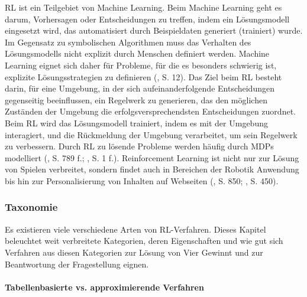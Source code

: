 \label{reinforcement-learning}

RL ist ein Teilgebiet von Machine Learning. Beim Machine Learning geht es darum, Vorhersagen oder Entscheidungen zu treffen, indem ein Lösungsmodell eingesetzt wird, das automatisiert durch Beispieldaten generiert (trainiert) wurde. Im Gegensatz zu symbolischen Algorithmen muss das Verhalten des Lösungsmodells nicht explizit durch Menschen definiert werden. Machine Learning eignet sich daher für Probleme, für die es besonders schwierig ist, explizite Lösungsstrategien zu definieren (\cite{Humm.2020}, S. 12). Das Ziel beim RL besteht darin, für eine Umgebung, in der sich aufeinanderfolgende Entscheidungen gegenseitig beeinflussen, ein Regelwerk zu generieren, das den möglichen Zuständen der Umgebung die erfolgsversprechendsten Entscheidungen zuordnet. Beim RL wird das Lösungsmodell trainiert, indem es mit der Umgebung interagiert, und die Rückmeldung der Umgebung verarbeitet, um sein Regelwerk zu verbessern. Durch RL zu lösende Probleme werden häufig durch MDPs modelliert (\cite{Russell.2020}, S. 789 f.; \cite{Sutton.2018}, S. 1 f.). Reinforcement Learning ist nicht nur zur Lösung von Spielen verbreitet, sondern findet auch in Bereichen der Robotik Anwendung bis hin zur Personalisierung von Inhalten auf Webseiten (\cite{Russell.2020}, S. 850; \cite{Sutton.2018}, S. 450).

\subsubsection{Taxonomie}

Es existieren viele verschiedene Arten von RL-Verfahren. Dieses Kapitel beleuchtet weit verbreitete Kategorien, deren Eigenschaften und wie gut sich Verfahren aus diesen Kategorien zur Lösung von Vier Gewinnt und zur Beantwortung der Fragestellung eignen.

\paragraph{Tabellenbasierte vs. approximierende Verfahren}

\label{tabellenbasiert-vs-approximierende-verfahren}

